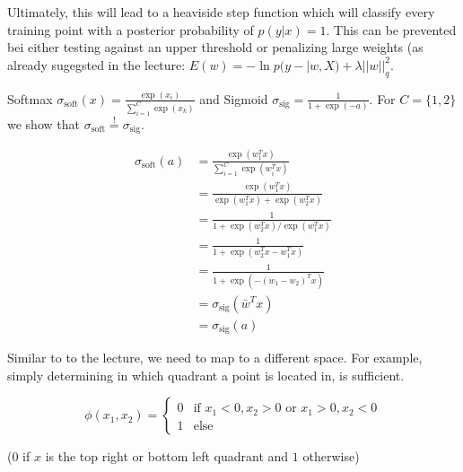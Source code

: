 \begin{flushleft}
Ultimately, this will lead to a heaviside step function which will classify every training point with a posterior probability of $p(y|x) = 1$. This can be prevented bei either testing against an upper threshold or penalizing large weights (as already sugegsted in the lecture: $E(w) = - \ln p(y-|w,X) + \lambda ||w||^2_q$.
\end{flushleft}
%
%
\begin{flushleft}
Softmax $\sigma_\text{soft}(x) = \frac{\exp(x_i)}{\sum_{i=1}^C \exp(x_k)}$
and Sigmoid $\sigma_\text{sig} = \frac{1}{1+\exp(-a)}$. For $C = \{1,2\}$ we show that $\sigma_\text{soft} \overset{!}{=} \sigma_\text{sig}$.
\end{flushleft}
\begin{align*}
  \sigma_\text{soft}(a) &= \frac{\exp(w_1^T x)}{\sum_{i=1}^C \exp(w_i^T x)} \\
  &= \frac{\exp(w_1^T x)}{\exp(w_1^T x) + \exp(w_2^T x)} \\
  &= \frac{1}{1+ \exp(w_2^T x) / \exp(w_1^T x)} \\
  &= \frac{1}{1+ \exp(w_2^T x - w_1^T x)} \\
  &= \frac{1}{1+ \exp(-(w_1 - w_2)^T x)} \\
  &= \sigma_\text{sig}(\bar{w}^T x) \\
  &= \sigma_\text{sig}(a)
\end{align*}
%
%
\begin{flushleft}
Similar to to the lecture, we need to map to a different space. For example, simply determining in which quadrant a point is located in, is sufficient. 
\end{flushleft}
\[
\phi(x_1, x_2) = 
  \begin{cases} 
    0 & \text{if } x_1 < 0, x_2 > 0 \text{ or } x_1 > 0, x_2 < 0 \\
    1 & \text{else}
  \end{cases}
\]
\begin{flushleft}
($0$ if $x$ is the top right or bottom left quadrant and $1$ otherwise)
\end{flushleft}




